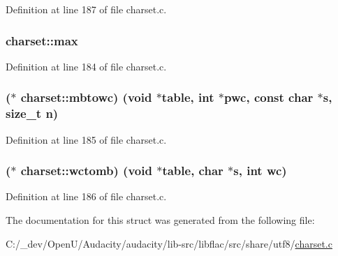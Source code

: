 Definition at line 187 of file charset.\+c.

\subsubsection[{\texorpdfstring{max}{max}}]{ charset\+::max}\hypertarget{structcharset_a35a17409926016f4c01050cac42aecab}{}\label{structcharset_a35a17409926016f4c01050cac42aecab}


Definition at line 184 of file charset.\+c.

\subsubsection[{\texorpdfstring{mbtowc}{mbtowc}}]{($\ast$ charset\+::mbtowc) ({\bf void} $\ast$table, {\bf int} $\ast$pwc, {\bf const} char $\ast${\bf s}, size\+\_\+t n)}\hypertarget{structcharset_ae21c41c91c92a31fc7c01f5e5691ab58}{}\label{structcharset_ae21c41c91c92a31fc7c01f5e5691ab58}


Definition at line 185 of file charset.\+c.

\subsubsection[{\texorpdfstring{wctomb}{wctomb}}]{($\ast$ charset\+::wctomb) ({\bf void} $\ast$table, char $\ast${\bf s}, {\bf int} wc)}\hypertarget{structcharset_a75074c655bc7a6d4f1b2214891894843}{}\label{structcharset_a75074c655bc7a6d4f1b2214891894843}


Definition at line 186 of file charset.\+c.



The documentation for this struct was generated from the following file\+:\begin{DoxyCompactItemize}
\item 
C\+:/\+\_\+dev/\+Open\+U/\+Audacity/audacity/lib-\/src/libflac/src/share/utf8/\hyperlink{share_2utf8_2charset_8c}{charset.\+c}\end{DoxyCompactItemize}
